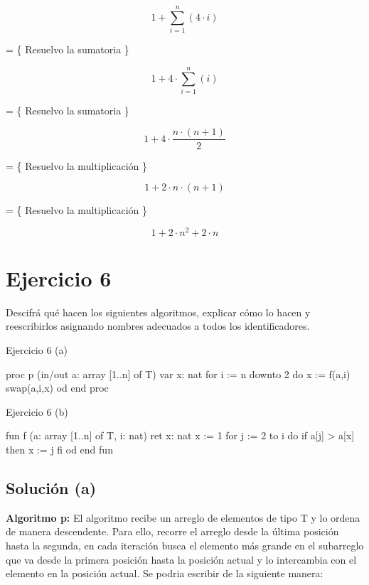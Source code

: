 \begin{equation*}
  1 + \sum_{i=1}^{n} \left(  4 \cdot i \right)
\end{equation*}

= \{ Resuelvo la sumatoria \}

\begin{equation*}
  1 + 4 \cdot \sum_{i=1}^{n} \left(  i \right)
\end{equation*}

= \{ Resuelvo la sumatoria \}

\begin{equation*}
  1 + 4 \cdot \frac{n \cdot (n+1)}{2}
\end{equation*}

= \{ Resuelvo la multiplicación \}

\begin{equation*}
  1 + 2 \cdot n \cdot (n+1)
\end{equation*}

= \{ Resuelvo la multiplicación \}

\begin{equation*}
  1 + 2 \cdot n^2 + 2 \cdot n
\end{equation*}

\section{Ejercicio 6}
Descifrá qué hacen los siguientes algoritmos, explicar cómo lo hacen y reescribirlos asignando nombres adecuados a todos los identificadores.

\begin{codebox}{Ejercicio 6 (a)}
\begin{pascallike}
proc p (in/out a: array [1..n] of T)
    var x: nat
    for i := n downto 2 do
    x := f(a,i)
    swap(a,i,x)
    od
end proc
\end{pascallike}
\end{codebox}

\begin{codebox}{Ejercicio 6 (b)}
\begin{pascallike}
fun f (a: array [1..n] of T, i: nat) ret x: nat
    x := 1
    for j := 2 to i do
    if a[j] > a[x] then
        x := j
    fi
    od
end fun
\end{pascallike}
\end{codebox}

\subsection{Solución (a)}
\textbf{Algoritmo p:} El algoritmo recibe un arreglo de elementos de tipo T y lo ordena de manera descendente. Para ello, recorre el arreglo desde la última posición hasta la segunda, en cada iteración busca el elemento más grande en el subarreglo que va desde la primera posición hasta la posición actual y lo intercambia con el elemento en la posición actual.
Se podria escribir de la siguiente manera:

